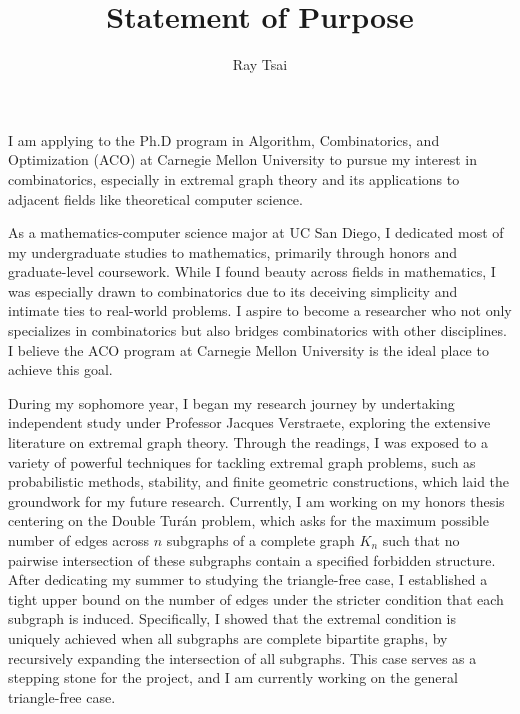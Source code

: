 \documentclass[12pt]{article}
\title{Statement of Purpose}
\author{Ray Tsai}
\date{}
\begin{document}
\maketitle

\vspace{-0.25in}

I am applying to the Ph.D program in Algorithm, Combinatorics, and Optimization (ACO) at Carnegie
Mellon University to pursue my interest in combinatorics, especially in extremal graph theory and
its applications to adjacent fields like theoretical computer science.

As a mathematics-computer science major at UC San Diego, I dedicated most of my undergraduate
studies to mathematics, primarily through honors and graduate-level coursework. While I found beauty
across fields in mathematics, I was especially drawn to combinatorics due to its deceiving
simplicity and intimate ties to real-world problems. I aspire to become a researcher who not only
specializes in combinatorics but also bridges combinatorics with other disciplines. I believe the
ACO program at Carnegie Mellon University is the ideal place to achieve this goal.

During my sophomore year, I began my research journey by undertaking independent study under
Professor Jacques Verstraete, exploring the extensive literature on extremal graph theory. Through
the readings, I was exposed to a variety of powerful techniques for tackling extremal graph
problems, such as probabilistic methods, stability, and finite geometric constructions, which laid
the groundwork for my future research. Currently, I am working on my honors thesis centering on the
Double Turán problem, which asks for the maximum possible number of edges across $n$ subgraphs of a
complete graph $K_n$ such that no pairwise intersection of these subgraphs contain a specified
forbidden structure. After dedicating my summer to studying the triangle-free case, I established a
tight upper bound on the number of edges under the stricter condition that each subgraph is induced.
Specifically, I showed that the extremal condition is uniquely achieved when all subgraphs are
complete bipartite graphs, by recursively expanding the intersection of all subgraphs. This case
serves as a stepping stone for the project, and I am currently working on the general triangle-free
case. 
\end{document}

